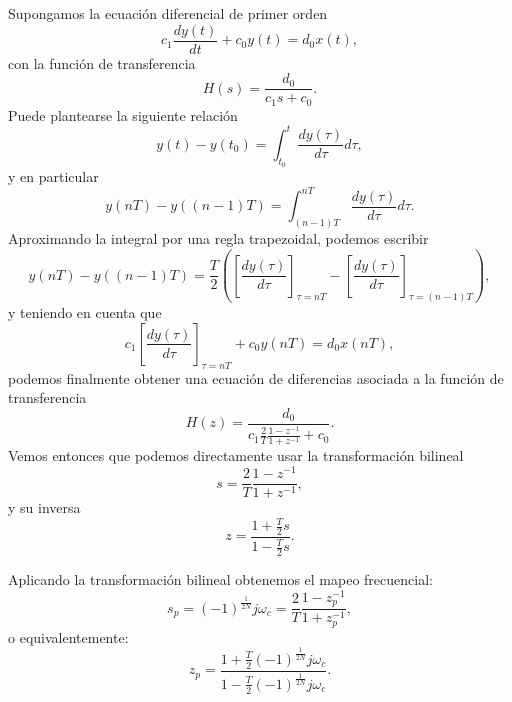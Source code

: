 \documentclass[11pt,a4paper,openany]{book}
\begin{document}
Supongamos la ecuaci\'{o}n diferencial de primer orden 
\begin{equation}
	c_{1}\frac{dy\left( t\right) }{dt}+c_{0}y\left( t\right) =d_{0}x\left( t\right) ,
\end{equation}
con la funci\'{o}n de transferencia 
\begin{equation}
	H\left( s\right) =\frac{d_{0}}{c_{1}s+c_{0}}.
\end{equation}
Puede plantearse la siguiente relaci\'{o}n 
\begin{equation}
	y\left( t\right) -y\left( t_{0}\right) =\int_{t_{0}}^{t}\frac{dy\left( \tau \right) }{d\tau }d\tau ,
\end{equation}
y en particular 
\begin{equation}
	y\left( nT\right) -y\left( \left( n-1\right) T\right) =\int_{\left( n-1\right) T}^{nT}\frac{dy\left( \tau \right) }{d\tau }d\tau .
\end{equation}
Aproximando la integral por una regla trapezoidal, podemos escribir 
\begin{equation}
	y\left( nT\right) -y\left( \left( n-1\right) T\right) =\frac{T}{2}\left( 
	\left[ \frac{dy\left( \tau \right) }{d\tau }\right] _{\tau =nT}-\left[ 
	\frac{dy\left( \tau \right) }{d\tau }\right] _{\tau =\left( n-1\right) T}\right) ,
\end{equation}
y teniendo en cuenta que 
\begin{equation}
	c_{1}\left[ \frac{dy\left( \tau \right) }{d\tau }\right] _{\tau =nT}+c_{0}y\left( nT\right) =d_{0}x\left( nT\right) ,
\end{equation}
podemos finalmente obtener una ecuaci\'{o}n de diferencias asociada a la funci\'{o}n de transferencia 
\begin{equation}
	H\left( z\right) =\frac{d_{0}}{c_{1}\frac{2}{T}\frac{1-z^{-1}}{1+z^{-1}} + c_{0}}.
\end{equation}
Vemos entonces que podemos directamente usar la transformaci\'{o}n bilineal 
\begin{equation}
	s=\frac{2}{T}\frac{1-z^{-1}}{1+z^{-1}},
\end{equation}
y su inversa
\begin{equation}
	z=\frac{1+\frac{T}{2}s}{1-\frac{T}{2}s}.
\end{equation}

Aplicando la transformaci\'{o}n bilineal obtenemos el mapeo frecuencial:
\begin{equation}
	s_{p}=\left( -1\right) ^{\frac{1}{2N}}j\omega _{c}=\frac{2}{T}\frac{1-z_{p}^{-1}}{1+z_{p}^{-1}},
\end{equation}
o equivalentemente:
\begin{equation}
	z_{p}=\frac{1+\frac{T}{2} \left( -1\right)^{\frac{1}{2N}}j\omega _{c}}{1-\frac{T}{2}\left( -1\right) ^{\frac{1}{2N}}j\omega _{c}}.
\end{equation}
\end{document}
